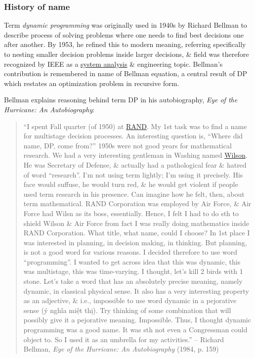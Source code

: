 \documentclass{article}
\begin{document}
\subsubsection{History of name}
Term {\it dynamic programming} was originally used in 1940s by {\sc Richard Bellman} to describe process of solving problems where one needs to find best decisions one after another. By 1953, he refined this to modern meaning, referring specifically to nesting smaller decision problems inside larger decisions, \& field was therefore recognized by IEEE as a \href{https://en.wikipedia.org/wiki/Systems_analysis}{system analysis} \& engineering topic. {\sc Bellman}'s contribution is remembered in name of Bellman equation, a central result of DP which restates an optimization problem in recursive form.

{\sc Bellman} explains reasoning behind term DP in his autobiography, {\it Eye of the Hurricane: An Autobiography}:
\begin{quote}
	``I spent Fall quarter (of 1950) at \href{https://en.wikipedia.org/wiki/RAND_Corporation}{RAND}. My 1st task was to find a name for multistage decision processes. An interesting question is, ``Where did name, DP, come from?'' 1950s were not good years for mathematical research. We had a very interesting gentleman in Washing named \href{https://en.wikipedia.org/wiki/Charles_Erwin_Wilson}{\sc Wilson}. He was Secretary of Defense, \& actually had a pathological fear \& hatred of word ``research''. I'm not using term lightly; I'm using it precisely. His face would suffuse, he would turn red, \& he would get violent if people used term research in his presence. Can imagine how he felt, then, about term mathematical. RAND Corporation was employed by Air Force, \& Air Force had {\sc Wilsn} as its boss, essentially. Hence, I felt I had to do sth to shield {\sc Wilson} \& Air Force from fact I was really doing mathematics inside RAND Corporation. What title, what name, could I choose? In 1st place I was interested in planning, in decision making, in thinking. But planning, is not a good word for various reasons. I decided therefore to use word ``programming''. I wanted to get across idea that this was dynamic, this was multistage, this was time-varying. I thought, let's kill 2 birds with 1 stone. Let's take a word that has an absolutely precise meaning, namely dynamic, in classical physical sense. It also has a very interesting property as an adjective, \& i.e., impossible to use word dynamic in a pejorative sense (ý nghĩa miệt thị). Try thinking of some combination that will possibly give it a pejorative meaning. Impossible. Thus, I thought dynamic programming was a good name. It was sth not even a Congressman could object to. So I used it as an umbrella for my activities.'' -- {\sc Richard Bellman}, {\it Eye of the Hurricane: An Autobiography} (1984, p. 159)
\end{quote}
\end{document}

